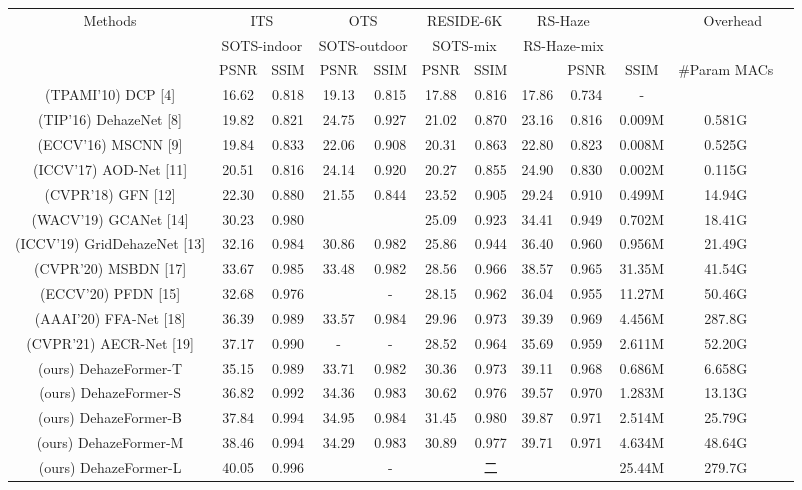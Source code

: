 \documentclass{article}
\begin{document}
\begin{tabular}{|c|c|c|c|c|c|c|c|c|c|c|c|}\hline
\multirow{2}{*}{Methods} & \multicolumn{2}{|c|}{ITS} & \multicolumn{2}{|c|}{OTS} & \multicolumn{2}{|c|}{RESIDE-6K} & \multicolumn{2}{|c|}{RS-Haze} & \multirow{2}{*}{} & \multicolumn{2}{|c|}{\multirow{2}{*}{Overhead}} \\ \cline{2-9}
  & \multicolumn{2}{|c|}{SOTS-indoor} & \multicolumn{2}{|c|}{SOTS-outdoor} & \multicolumn{2}{|c|}{SOTS-mix} & \multicolumn{2}{|c|}{RS-Haze-mix} &   &   &   \\ \hline
 & PSNR & SSIM & PSNR & SSIM & PSNR & SSIM &  & PSNR & SSIM & #Param MACs &  \\ \hline
(TPAMI'10) DCP [4] & 16.62 & 0.818 & 19.13 & 0.815 & 17.88 & 0.816 & 17.86 & 0.734 & - &  &  \\ \hline
(TIP'16) DehazeNet [8] & 19.82 & 0.821 & 24.75 & 0.927 & 21.02 & 0.870 & 23.16 & 0.816 & 0.009M & 0.581G &  \\ \hline
(ECCV'16) MSCNN [9] & 19.84 & 0.833 & 22.06 & 0.908 & 20.31 & 0.863 & 22.80 & 0.823 & 0.008M & 0.525G &  \\ \hline
(ICCV'17) AOD-Net [11] & 20.51 & 0.816 & 24.14 & 0.920 & 20.27 & 0.855 & 24.90 & 0.830 & 0.002M & 0.115G &  \\ \hline
(CVPR'18) GFN [12] & 22.30 & 0.880 & 21.55 & 0.844 & 23.52 & 0.905 & 29.24 & 0.910 & 0.499M & 14.94G &  \\ \hline
(WACV'19) GCANet [14] & 30.23 & 0.980 &  &  & 25.09 & 0.923 & 34.41 & 0.949 & 0.702M & 18.41G &  \\ \hline
(ICCV'19) GridDehazeNet [13] & 32.16 & 0.984 & 30.86 & 0.982 & 25.86 & 0.944 & 36.40 & 0.960 & 0.956M & 21.49G &  \\ \hline
(CVPR'20) MSBDN [17] & 33.67 & 0.985 & 33.48 & 0.982 & 28.56 & 0.966 & 38.57 & 0.965 & 31.35M & 41.54G &  \\ \hline
(ECCV'20) PFDN [15] & 32.68 & 0.976 &  & - & 28.15 & 0.962 & 36.04 & 0.955 & 11.27M & 50.46G &  \\ \hline
(AAAI'20) FFA-Net [18] & 36.39 & 0.989 & 33.57 & 0.984 & 29.96 & 0.973 & 39.39 & 0.969 & 4.456M & 287.8G &  \\ \hline
(CVPR'21) AECR-Net [19] & 37.17 & 0.990 & - & - & 28.52 & 0.964 & 35.69 & 0.959 & 2.611M & 52.20G &  \\ \hline
(ours) DehazeFormer-T & 35.15 & 0.989 & 33.71 & 0.982 & 30.36 & 0.973 & 39.11 & 0.968 & 0.686M & 6.658G &  \\ \hline
(ours) DehazeFormer-S & 36.82 & 0.992 & 34.36 & 0.983 & 30.62 & 0.976 & 39.57 & 0.970 & 1.283M & 13.13G &  \\ \hline
(ours) DehazeFormer-B & 37.84 & 0.994 & 34.95 & 0.984 & 31.45 & 0.980 & 39.87 & 0.971 & 2.514M & 25.79G &  \\ \hline
(ours) DehazeFormer-M & 38.46 & 0.994 & 34.29 & 0.983 & 30.89 & 0.977 & 39.71 & 0.971 & 4.634M & 48.64G &  \\ \hline
(ours) DehazeFormer-L & 40.05 & 0.996 &  & - &  & 二 &  &  & 25.44M & 279.7G &  \\ \hline
\end{tabular}
\end{document}
